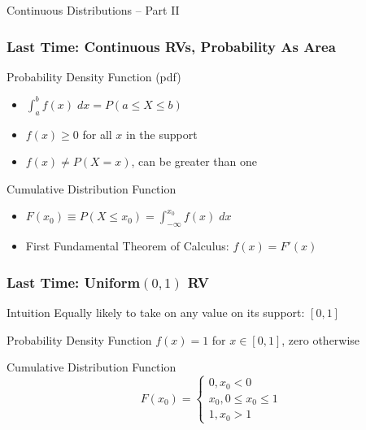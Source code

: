 \documentclass[handout]{beamer}
\date{Lecture \# 12}
\begin{document}
 


\begin{frame}[plain]
	\titlepage 
	

\end{frame} 


\begin{frame}
\begin{center}
\Huge Continuous Distributions -- Part II
\end{center}
\end{frame}


\begin{frame}
\frametitle{Last Time: Continuous RVs,  Probability As Area}
\begin{block}{Probability Density Function (pdf)}
	\begin{itemize}
		\item $\int_a^b f(x) \; dx = P(a \leq X \leq b)$
		\item $f(x) \geq 0$ for all $x$ in the support
		\item $f(x) \neq P(X=x)$, can be greater than one
	\end{itemize}
\end{block}

\begin{block}{Cumulative Distribution Function}
	\begin{itemize}
		\item $F(x_0) \equiv P(X\leq x_0) =  \int_{-\infty}^{x_0} f(x) \; dx$
		\item First Fundamental Theorem of Calculus: $f(x) = F'(x)$ 
	\end{itemize}
\end{block}


\end{frame}
\begin{frame}
\frametitle{Last Time: Uniform$(0,1)$ RV}
\begin{block}{Intuition}
Equally likely to take on any value on its support: $[0,1]$
\end{block}
\begin{block}{Probability Density Function}
	$f(x) = 1$ for $x \in [0,1]$, zero otherwise
\end{block}
\begin{block}{Cumulative Distribution Function}
	$$ F(x_0) = \left\{ \begin{array}{c} 0, x_0 < 0\\ x_0, 0\leq x_0 \leq 1\\ 1, x_0 > 1   \end{array}\right.$$
\end{block}
\end{frame}
\end{document}
